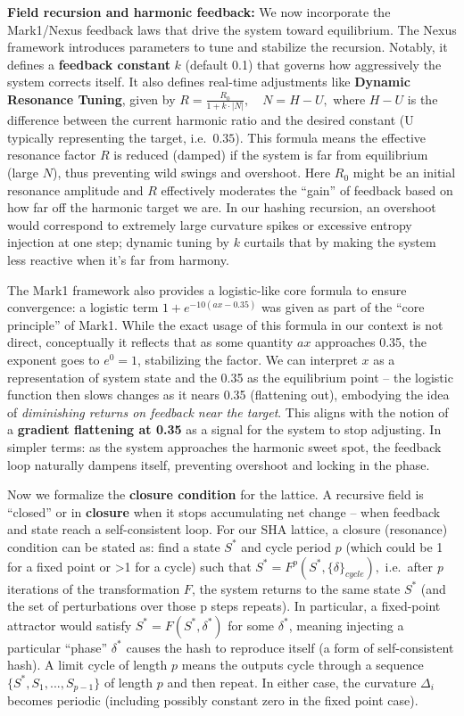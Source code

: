 \documentclass[11pt]{article}
\begin{document}
\textbf{Field recursion and harmonic feedback:} We now incorporate the
Mark1/Nexus feedback laws that drive the system toward equilibrium. The
Nexus framework introduces parameters to tune and stabilize the
recursion. Notably, it defines a \textbf{feedback constant} \(k\)
(default 0.1) that governs how aggressively the system corrects itself.
It also defines real-time adjustments like \textbf{Dynamic Resonance
Tuning}, given by \(R = \frac{R_0}{1 + k \cdot |N|}, \quad N = H - U,\)
where \(H - U\) is the difference between the current harmonic ratio and
the desired constant (U typically representing the target,
i.e.~\(0.35\)). This formula means the effective resonance factor \(R\)
is reduced (damped) if the system is far from equilibrium (large \(N\)),
thus preventing wild swings and overshoot. Here \(R_0\) might be an
initial resonance amplitude and \(R\) effectively moderates the ``gain''
of feedback based on how far off the harmonic target we are. In our
hashing recursion, an overshoot would correspond to extremely large
curvature spikes or excessive entropy injection at one step; dynamic
tuning by \(k\) curtails that by making the system less reactive when
it's far from harmony.

The Mark1 framework also provides a logistic-like core formula to ensure
convergence: a logistic term \(1 + e^{-10(a x - 0.35)}\) was given as
part of the ``core principle'' of Mark1. While the exact usage of this
formula in our context is not direct, conceptually it reflects that as
some quantity \(a x\) approaches 0.35, the exponent goes to \(e^0=1\),
stabilizing the factor. We can interpret \(x\) as a representation of
system state and the 0.35 as the equilibrium point -- the logistic
function then slows changes as it nears 0.35 (flattening out), embodying
the idea of \emph{diminishing returns on feedback near the target}. This
aligns with the notion of a \textbf{gradient flattening at 0.35} as a
signal for the system to stop adjusting. In simpler terms: as the system
approaches the harmonic sweet spot, the feedback loop naturally dampens
itself, preventing overshoot and locking in the phase.

Now we formalize the \textbf{closure condition} for the lattice. A
recursive field is ``closed'' or in \textbf{closure} when it stops
accumulating net change -- when feedback and state reach a
self-consistent loop. For our SHA lattice, a closure (resonance)
condition can be stated as: find a state \(S^*\) and cycle period \(p\)
(which could be 1 for a fixed point or \textgreater1 for a cycle) such
that \(S^* = F^p(S^*, \{\delta\}_{cycle}),\) i.e.~after \emph{p}
iterations of the transformation \(F\), the system returns to the same
state \(S^*\) (and the set of perturbations over those p steps repeats).
In particular, a fixed-point attractor would satisfy
\(S^* = F(S^*, \delta^*)\) for some \(\delta^*\), meaning injecting a
particular ``phase'' \(\delta^*\) causes the hash to reproduce itself (a
form of self-consistent hash). A limit cycle of length \(p\) means the
outputs cycle through a sequence \(\{S^*, S_1, ..., S_{p-1}\}\) of
length \(p\) and then repeat. In either case, the curvature \(\Delta_i\)
becomes periodic (including possibly constant zero in the fixed point
case).
\end{document}
